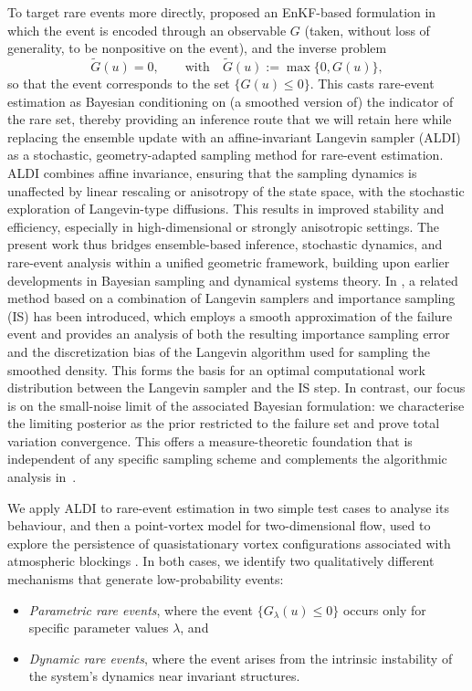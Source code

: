 \documentclass[a4paper]{article}
\numberwithin{equation}{section}
\begin{document}
To target rare events more directly, \cite{Wagner21} proposed an EnKF-based formulation in which the event is encoded through an observable $G$ (taken, without loss of generality, to be nonpositive on the event), and the inverse problem
\begin{equation}
  \tilde{G}(u)=0, 
  \qquad \text{with} \quad
  \tilde{G}(u):=\max\{0,G(u)\},
\end{equation}
so that the event corresponds to the set $\{G(u)\le 0\}$. This casts rare-event estimation as Bayesian conditioning on (a smoothed version of) the indicator of the rare set, thereby providing an inference route that we will retain here while replacing the ensemble update with an affine-invariant Langevin sampler (ALDI) \cite{Nusken20} as a stochastic, geometry-adapted sampling method for rare-event estimation. ALDI combines affine invariance, ensuring that the sampling dynamics is unaffected by linear rescaling or anisotropy of the state space, with the stochastic exploration of Langevin-type diffusions. This results in improved stability and efficiency, especially in high-dimensional or strongly anisotropic settings. The present work thus bridges ensemble-based inference, stochastic dynamics, and rare-event analysis within a unified geometric framework, building upon earlier developments in Bayesian sampling and dynamical systems theory. In \cite{beh2025affineinvariantinteractinglangevin}, a related method based on a combination of Langevin samplers and importance sampling (IS) has been introduced, which employs a smooth
approximation of the failure event and provides an analysis of both the resulting
importance sampling error and the discretization bias of the Langevin algorithm used for sampling the smoothed density. This forms the basis for an optimal computational work distribution between the Langevin sampler and the IS step. In contrast, our focus is on the small-noise limit of the
associated Bayesian formulation: we characterise the limiting posterior as the prior
restricted to the failure set and prove total variation convergence. This offers a
measure-theoretic foundation that is independent of any specific sampling scheme and
complements the algorithmic analysis in~\cite{beh2025affineinvariantinteractinglangevin}.

We apply ALDI to rare-event estimation in two simple test cases to analyse its behaviour, and then a point-vortex model for two-dimensional flow, used to explore the persistence of quasistationary vortex configurations associated with atmospheric blockings \cite{Kuhlbrodt00}.
In both cases, we identify two qualitatively different mechanisms that generate low-probability events:
\begin{itemize}
    \item \textit{Parametric rare events}, where the event $\{G_\lambda(u)\le 0\}$ occurs only for specific parameter values $\lambda$, and
    \item \textit{Dynamic rare events}, where the event arises from the intrinsic instability of the system’s dynamics near invariant structures.
\end{itemize}
\end{document}
